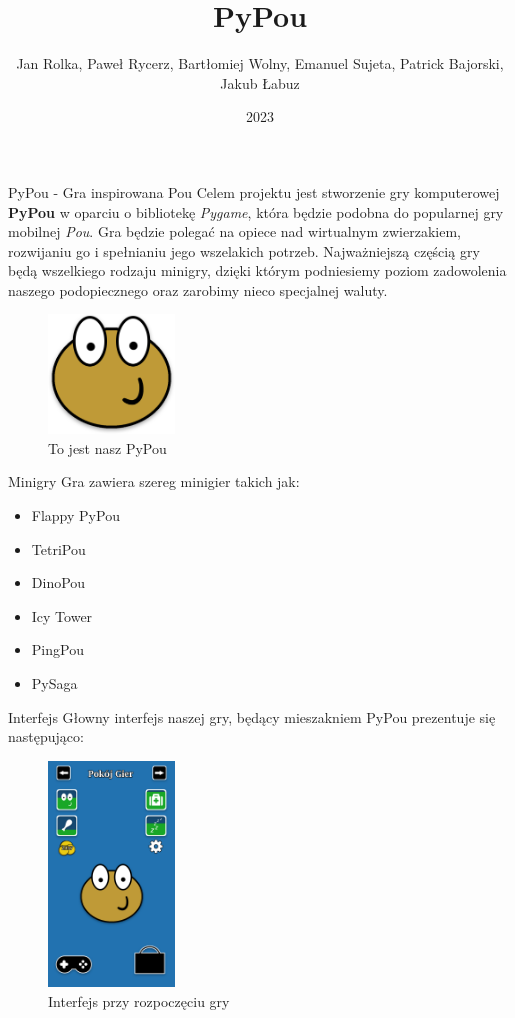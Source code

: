 \documentclass{beamer}
\title{PyPou}
\author{Jan Rolka, Paweł Rycerz, Bartłomiej Wolny, Emanuel Sujeta, Patrick Bajorski, Jakub Łabuz}
\institute{AGH}
\date{2023}
\begin{document}
\frame{\titlepage}

\begin{frame}{PyPou - Gra inspirowana Pou}
Celem projektu jest stworzenie gry komputerowej \textbf{PyPou} w oparciu o bibliotekę \textit{Pygame}\cite{coding_with_russ_kanal_nodate}, która będzie podobna do popularnej gry mobilnej \textit{Pou}. Gra będzie polegać na opiece nad wirtualnym zwierzakiem, rozwijaniu go i spełnianiu jego wszelakich potrzeb. Najważniejszą częścią gry będą wszelkiego rodzaju minigry, dzięki którym podniesiemy poziom zadowolenia naszego podopiecznego oraz zarobimy nieco specjalnej waluty.
\begin{figure}[h]
  \centering
  \includegraphics[width=0.3\textwidth]{grafiki/PyPou.png}
  \caption{To jest nasz PyPou}
\end{figure}
\end{frame}

\begin{frame}{Minigry}
    Gra zawiera szereg minigier takich jak:
    \begin{itemize}
        \item Flappy PyPou
        \item TetriPou
        \item DinoPou
        \item Icy Tower
        \item PingPou
        \item PySaga
    \end{itemize}
\end{frame}

\begin{frame}{Interfejs}
    Głowny interfejs naszej gry, będący mieszakniem PyPou prezentuje się następująco:
    \begin{figure}
        \centering
        \includegraphics[width=0.3\textwidth]{grafiki/prototypUI3.png}
        \caption{Interfejs przy rozpoczęciu gry}
        \label{fig:UI1}
    \end{figure}
\end{frame}
\end{document}
